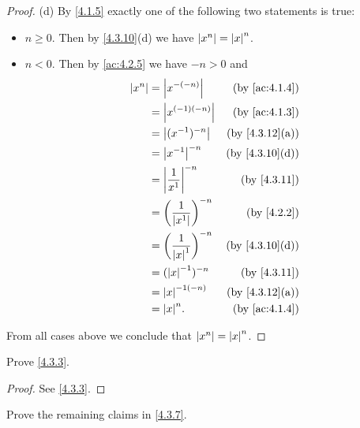 \begin{proof}{(d)}
  By \cref{4.1.5} exactly one of the following two statements is true:
  \begin{itemize}
    \item \(n \geq 0\).
          Then by \cref{4.3.10}(d) we have \(\left\lvert x^n\right\rvert = \left\lvert x\right\rvert^n\).
    \item \(n < 0\).
          Then by \cref{ac:4.2.5} we have \(-n > 0\) and
          \begin{align*}
            \abs{x^n} & = \abs{x^{-(-n)}}                      & \text{(by \cref{ac:4.1.4})}  \\
                      & = \abs{x^{(-1)(-n)}}                   & \text{(by \cref{ac:4.1.3})}  \\
                      & = \abs{(x^{-1})^{-n}}                  & \text{(by \cref{4.3.12}(a))} \\
                      & = \abs{x^{-1}}^{-n}                    & \text{(by \cref{4.3.10}(d))} \\
                      & = \abs{\frac{1}{x^1}}^{-n}             & \text{(by \cref{4.3.11})}    \\
                      & = \bigg(\frac{1}{\abs{x^1}}\bigg)^{-n} & \text{(by \cref{4.2.2})}     \\
                      & = \bigg(\frac{1}{\abs{x}^1}\bigg)^{-n} & \text{(by \cref{4.3.10}(d))} \\
                      & = (\abs{x}^{-1})^{-n}                  & \text{(by \cref{4.3.11})}    \\
                      & = \abs{x}^{-1(-n)}                     & \text{(by \cref{4.3.12}(a))} \\
                      & = \abs{x}^n.                           & \text{(by \cref{ac:4.1.4})}
          \end{align*}
  \end{itemize}
  From all cases above we conclude that \(\left\lvert x^n\right\rvert = \left\lvert x\right\rvert^n\).
\end{proof}

\exercisesection

\begin{ex}\label{ex:4.3.1}
  Prove \cref{4.3.3}.
\end{ex}

\begin{proof}
  See \cref{4.3.3}.
\end{proof}

\begin{ex}\label{ex:4.3.2}
  Prove the remaining claims in \cref{4.3.7}.
\end{ex}

